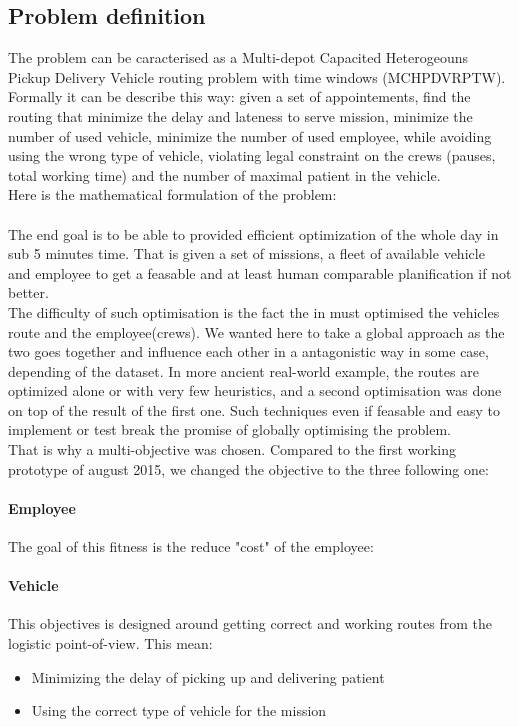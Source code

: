 \documentclass[12pt]{memoir}
\begin{document}

\subsection{Problem definition}
The problem can be caracterised as a Multi-depot Capacited Heterogeouns Pickup
Delivery Vehicle routing problem with time windows (MCHPDVRPTW). \\
Formally it can be describe this way: given a set of appointements, find the routing that minimize the
delay and lateness to serve mission, minimize the number of used vehicle, minimize
the number of used employee, while avoiding using the wrong type of vehicle,
violating legal constraint on the crews (pauses, total working time) and the number
of maximal patient in the vehicle.\\
Here is the mathematical formulation of the problem:
%
%
\\
\\
The end goal is to be able to provided efficient optimization of the whole day in
sub 5 minutes time. That is given a set of missions, a fleet of available vehicle
and employee to get a feasable and at least human comparable planification if not
better. \\
The difficulty of such optimisation is the fact the in must optimised the vehicles
route and the employee(crews). We wanted here to take a global approach as the two
goes together and influence each other in a antagonistic way in some case, depending
of the dataset. In more ancient real-world example, the routes are optimized alone
or with very few heuristics, and a second optimisation was done on top of the result
of the first one. Such techniques even if feasable and easy to implement or test
break the promise of globally optimising the problem.\\
That is  why a multi-objective was chosen. Compared to the first working prototype
of august 2015, we changed the objective to the three following one:

\paragraph{Employee} %
\label{par:Employee}
The goal of this fitness is the reduce "cost" of the employee:


\paragraph{Vehicle} %
\label{par:Vehicle}
This objectives is designed around getting correct and working routes from the
logistic point-of-view. This mean:
\begin{itemize}
  \item Minimizing the delay of picking up and delivering patient
  \item Using the correct type of vehicle for the mission
\end{itemize}
\end{document}

